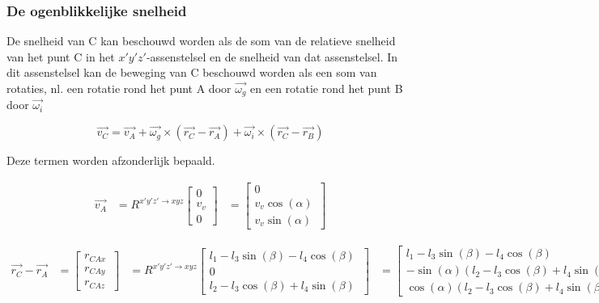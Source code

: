 \subsubsection{De ogenblikkelijke snelheid}
De snelheid van C kan beschouwd worden als de som van de relatieve snelheid van het punt C in het $x'y'z'$-assenstelsel en de snelheid van dat assenstelsel. In dit assenstelsel kan de beweging van C beschouwd worden als een som van rotaties, nl. een rotatie rond het punt A door $\overrightarrow{\omega_{g}}$ en een rotatie rond het punt B door $\overrightarrow{\omega_{i}}$

\begin{equation*}
\overrightarrow{v_{C}}=\overrightarrow{v_{A}}+\overrightarrow{\omega_{g}}\times(\overrightarrow{r_{C}}-\overrightarrow{r_{A}})+\overrightarrow{\omega_{i}}\times(\overrightarrow{r_{C}}-\overrightarrow{r_{B}})
\end{equation*}

Deze termen worden afzonderlijk bepaald.

\begin{equation*}
\begin{split}
\overrightarrow{v_{A}}
&=R^{x'y'z' \rightarrow xyz}
	\begin{bmatrix}
	0\\
	v_v\\
	0
	\end{bmatrix}
&=	\begin{bmatrix}
	0\\
	v_v\cos(\alpha)\\
	v_v\sin(\alpha)\
	\end{bmatrix}
\end{split}
\end{equation*}

\begin{equation*}
\begin{split}
\overrightarrow{r_{C}}-\overrightarrow{r_{A}}
&=	\begin{bmatrix}
	r_{CAx}\\
	r_{CAy}\\
	r_{CAz}\
	\end{bmatrix}
&=R^{x'y'z' \rightarrow xyz}
	\begin{bmatrix}
	l_{1}-l_{3}\sin(\beta)-l_{4}\cos(\beta)\\
	0\\
	l_{2}-l_{3}\cos(\beta)+l_{4}\sin(\beta)\
	\end{bmatrix}
&=	\begin{bmatrix}
	l_{1}-l_{3}\sin(\beta)-l_{4}\cos(\beta)\\
	-\sin(\alpha)(l_{2}-l_{3}\cos(\beta)+l_{4}\sin(\beta))\\
	\cos(\alpha)(l_{2}-l_{3}\cos(\beta)+l_{4}\sin(\beta))\
	\end{bmatrix}
\end{split}
\end{equation*}

